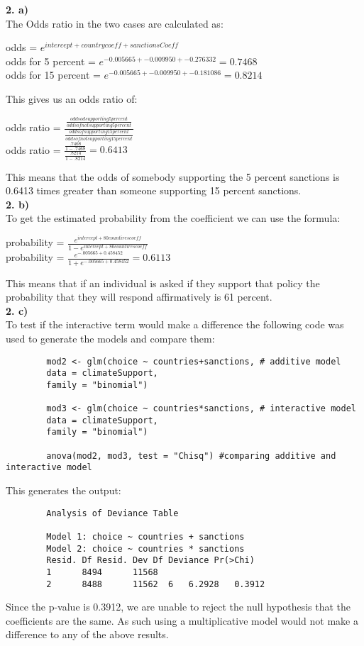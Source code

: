 \documentclass{article}
\begin{document}
	
	
	\textbf{2. a)\\}
	The Odds ratio in the two cases are calculated as:\\
	\begin{center}
		odds = $e^{intercept + country coeff + sanctions Coeff}$\\
		odds for 5 percent = $e^{-0.005665 + -0.009950 + -0.276332} = 0.7468$\\
		odds for 15 percent = $e^{-0.005665 + -0.009950 + -0.181086} = 0.8214$\\
	\end{center}
	This gives us an odds ratio of:
	\begin{center}
		odds ratio = $\frac{\frac{odds od supporting 5 percent}{odds of not supporting 5 percent}}{\frac{odds of supporting 15 percent}{odds of not supporting 15 percent}}$\\
		odds ratio = $\frac{\frac{.7468}{1-.7468}}{\frac{.8214}{1-.8214}} = 0.6413$	\\
	\end{center}
This means that the odds of somebody supporting the 5 percent sanctions is 0.6413 times greater than someone supporting 15 percent sanctions.\\
\textbf{2. b)\\}
To get the estimated probability from the coefficient we can use the formula:
\begin{center}
	probability = $\frac{e^{intercept + 80 countires coeff}}{1-e^{intercept + 80 countires coeff}}$\\
	probability = $\frac{e^{-.005665 + 0.458452}}{1 + e^{-.005665 + 0.458452}} = 0.6113$\\
\end{center}
This means that if an individual is asked if they support that policy the probability that they will respond affirmatively is 61 percent.\\
\textbf{2. c)\\}
To test if the interactive term would make a difference the following code was used to generate the models and compare them:
	\begin{verbatim}
		mod2 <- glm(choice ~ countries+sanctions, # additive model
		data = climateSupport, 
		family = "binomial")
		
		mod3 <- glm(choice ~ countries*sanctions, # interactive model
		data = climateSupport, 
		family = "binomial")
		
		anova(mod2, mod3, test = "Chisq") #comparing additive and interactive model
	\end{verbatim}
	This generates the output:
	\begin{verbatim}
		Analysis of Deviance Table
		
		Model 1: choice ~ countries + sanctions
		Model 2: choice ~ countries * sanctions
		Resid. Df Resid. Dev Df Deviance Pr(>Chi)
		1      8494      11568                     
		2      8488      11562  6   6.2928   0.3912
	\end{verbatim}
	Since the p-value is 0.3912, we are unable to reject the null hypothesis that the coefficients are the same. As such using a multiplicative model would not make a difference to any of the above results.
\end{document}
